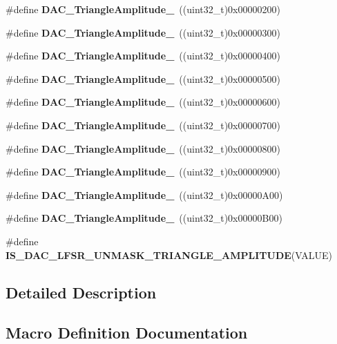 \begin{DoxyCompactItemize}
\item 
\#define \textbf{ D\+A\+C\+\_\+\+Triangle\+Amplitude\+\_}~((uint32\+\_\+t)0x00000200)
\item 
\#define \textbf{ D\+A\+C\+\_\+\+Triangle\+Amplitude\+\_}~((uint32\+\_\+t)0x00000300)
\item 
\#define \textbf{ D\+A\+C\+\_\+\+Triangle\+Amplitude\+\_}~((uint32\+\_\+t)0x00000400)
\item 
\#define \textbf{ D\+A\+C\+\_\+\+Triangle\+Amplitude\+\_}~((uint32\+\_\+t)0x00000500)
\item 
\#define \textbf{ D\+A\+C\+\_\+\+Triangle\+Amplitude\+\_}~((uint32\+\_\+t)0x00000600)
\item 
\#define \textbf{ D\+A\+C\+\_\+\+Triangle\+Amplitude\+\_}~((uint32\+\_\+t)0x00000700)
\item 
\#define \textbf{ D\+A\+C\+\_\+\+Triangle\+Amplitude\+\_}~((uint32\+\_\+t)0x00000800)
\item 
\#define \textbf{ D\+A\+C\+\_\+\+Triangle\+Amplitude\+\_}~((uint32\+\_\+t)0x00000900)
\item 
\#define \textbf{ D\+A\+C\+\_\+\+Triangle\+Amplitude\+\_}~((uint32\+\_\+t)0x00000\+A00)
\item 
\#define \textbf{ D\+A\+C\+\_\+\+Triangle\+Amplitude\+\_}~((uint32\+\_\+t)0x00000\+B00)
\item 
\#define \textbf{ I\+S\+\_\+\+D\+A\+C\+\_\+\+L\+F\+S\+R\+\_\+\+U\+N\+M\+A\+S\+K\+\_\+\+T\+R\+I\+A\+N\+G\+L\+E\+\_\+\+A\+M\+P\+L\+I\+T\+U\+DE}(V\+A\+L\+UE)
\end{DoxyCompactItemize}


\subsection{Detailed Description}


\subsection{Macro Definition Documentation}
\mbox{\label{group__DAC__lfsrunmask__triangleamplitude_ga60794fd5092a332cfa82e1cee13945fc}} 
